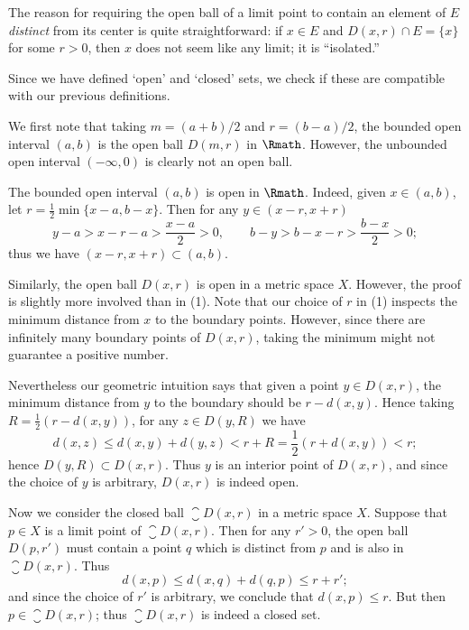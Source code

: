The reason for requiring the open ball of a limit point
to contain an element of \(E\) \emph{distinct} from its center
is quite straightforward:
if \(x\in E\) and \(D(x,r)\cap E=\{x\}\) for some \(r>0\),
then \(x\) does not seem like any limit;
it is ``isolated.''

Since we have defined `open' and `closed' sets,
we check if these are compatible with our previous definitions.

\begin{example}
    \label{exm:opcl}
    We first note that
    taking \(m=(a+b)/2\) and \(r=(b-a)/2\),
    the bounded open interval \((a,b)\)
    is the open ball \(D(m,r)\) in \(\Rmath\).
    However, the unbounded open interval \((-\infty,0)\)
    is clearly not an open ball.
    \begin{nlist}
        \item The bounded open interval \((a,b)\) is open in \(\Rmath\).
        Indeed, given \(x\in(a,b)\),
        let \(r=\frac{1}{2}\min\{x-a,b-x\}\).
        Then for any \(y\in(x-r,x+r)\)
        \[
            y-a
            >x-r-a
            >\frac{x-a}{2}
            >0,
            \qquad
            b-y
            >b-x-r
            >\frac{b-x}{2}
            >0;
        \]
        thus we have \((x-r,x+r)\subset(a,b)\).
        
        \item Similarly,
        the open ball \(D(x,r)\) is open in a metric space \(X\).
        However, the proof is slightly more involved than in (1).
        Note that
        our choice of \(r\) in (1) inspects the minimum distance
        from \(x\) to the boundary points.
        However,
        since there are infinitely many boundary points of \(D(x,r)\),
        taking the minimum might not guarantee a positive number.
        
        Nevertheless our geometric intuition says that
        given a point \(y\in D(x,r)\),
        the minimum distance from \(y\) to the boundary
        should be \(r-d(x,y)\).
        Hence taking \(R=\frac{1}{2}(r-d(x,y))\),
        for any \(z\in D(y,R)\) we have
        \[
            d(x,z)
            \le d(x,y)+d(y,z)
            <r+R
            =\frac{1}{2}(r+d(x,y))
            <r;
        \]
        hence \(D(y,R)\subset D(x,r)\).
        Thus \(y\) is an interior point of \(D(x,r)\),
        and since the choice of \(y\) is arbitrary,
        \(D(x,r)\) is indeed open.

        \item Now we consider the closed ball \(\closure D(x,r)\)
        in a metric space \(X\).
        Suppose that \(p\in X\) is a limit point of \(\closure D(x,r)\).
        Then for any \(r'>0\),
        the open ball \(D(p,r')\) must contain a point \(q\)
        which is distinct from \(p\) and is also in \(\closure D(x,r)\).
        Thus
        \[
            d(x,p)
            \le d(x,q)+d(q,p)
            \le r+r';
        \]
        and since the choice of \(r'\) is arbitrary,
        we conclude that \(d(x,p)\le r\).
        But then \(p\in\closure D(x,r)\);
        thus \(\closure D(x,r)\) is indeed a closed set.


\end{nlist}
\end{example}
